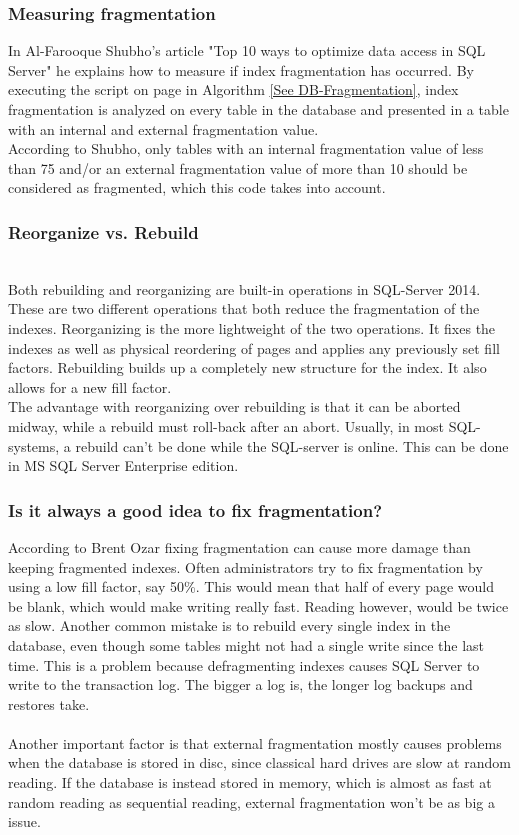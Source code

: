 \documentclass{cslthse-msc}
\begin{document}
\subsubsection{Measuring fragmentation}
In Al-Farooque Shubho's article "Top 10 ways to optimize data access in SQL Server"\cite{Shubho09} he explains how to measure if index fragmentation has occurred. By executing the script on page \pageref{lst:fragalg} in Algorithm \ref{See DB-Fragmentation}, index fragmentation is analyzed on every table in the database and presented in a table with an internal and external fragmentation value. \\

According to Shubho, only tables with an internal fragmentation value of less than 75 and/or an external fragmentation value of more than 10 should be considered as fragmented, which this code takes into account.

\subsubsection{Reorganize vs. Rebuild}\mbox{}\\
Both rebuilding and reorganizing are built-in operations in SQL-Server 2014. These are two different operations that both reduce the fragmentation of the indexes. Reorganizing is the more lightweight of the two operations. It fixes the indexes as well as physical reordering of pages and applies any previously set fill factors. Rebuilding builds up a completely new structure for the index. It also allows for a new fill factor.\\
The advantage with reorganizing over rebuilding is that it can be aborted midway, while a rebuild must roll-back after an abort. Usually, in most SQL-systems, a rebuild can't be done while the SQL-server is online. This can be done in MS SQL Server Enterprise edition\cite{Little13}.

\subsubsection{Is it always a good idea to fix fragmentation?}
According to Brent Ozar\cite{Ozar12} fixing fragmentation can cause more damage than keeping fragmented indexes. Often administrators try to fix fragmentation by using a low fill factor, say 50\%. This would mean that half of every page would be blank, which would make writing really fast. Reading however, would be twice as slow. Another common mistake is to rebuild every single index in the database, even though some tables might not had a single write since the last time. This is a problem because defragmenting indexes causes SQL Server to write to the transaction log. The bigger a log is, the longer log backups and restores take.\\\\
Another important factor is that external fragmentation mostly causes problems when the database is stored in disc, since classical hard drives are slow at random reading. If the database is instead stored in memory, which is almost as fast at random reading as sequential reading, external fragmentation won't be as big a issue.
\end{document}
